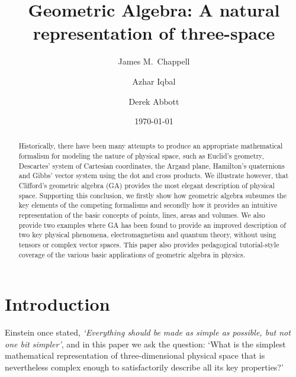\documentclass[prb,preprint]{revtex4}
\begin{document}

\title{Geometric Algebra: A natural representation of three-space}  
\author{James M.~Chappell}
\author{Azhar Iqbal}
\author{Derek Abbott}
\date{\today}


\begin{abstract}
Historically, there have been many attempts to produce an appropriate mathematical formalism for modeling the nature of physical space, such as Euclid's geometry, Descartes' system of Cartesian coordinates, the Argand plane, Hamilton's quaternions and Gibbs' vector system using the dot and cross products.  We illustrate however, that Clifford's geometric algebra (GA) provides the most elegant description of physical space.  Supporting this conclusion, we firstly show how geometric algebra subsumes the key elements of the competing formalisms and secondly how it provides an intuitive representation of the basic concepts of points, lines, areas and volumes. We also provide two examples where GA has been found to provide an improved description of two key physical phenomena, electromagnetism and quantum theory, without using tensors or complex vector spaces. This paper also provides pedagogical tutorial-style coverage of the various basic applications of geometric algebra in physics.
\end{abstract}

\maketitle


\section{Introduction}

Einstein once stated, {\it{`Everything should be made as simple as possible, but not one bit simpler'}}, and in this paper we ask the question: `What is the simplest mathematical representation of three-dimensional physical space that is nevertheless complex enough to satisfactorily describe all its key properties?'
\end{document}
